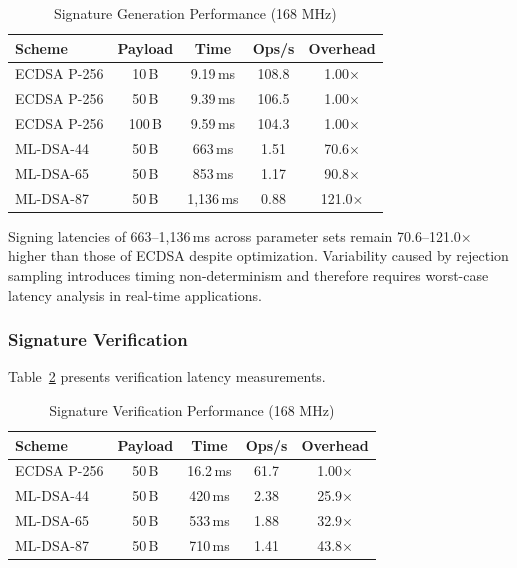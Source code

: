 \documentclass[final, twoside]{IEEEtran} %
\begin{document}
\begin{table}[h]
	\centering
	\caption{Signature Generation Performance (168 MHz)}
	\label{tab:sign-performance}
	\begin{tabular}{lcccc}
		\toprule
		\textbf{Scheme} & \textbf{Payload} & \textbf{Time} & \textbf{Ops/s} & \textbf{Overhead} \\
		\midrule
		ECDSA P-256     & 10\,B            & 9.19\,ms      & 108.8          & 1.00$\times$      \\
		ECDSA P-256     & 50\,B            & 9.39\,ms      & 106.5          & 1.00$\times$      \\
		ECDSA P-256     & 100\,B           & 9.59\,ms      & 104.3          & 1.00$\times$      \\
		\midrule
		ML-DSA-44       & 50\,B            & 663\,ms       & 1.51           & 70.6$\times$      \\
		ML-DSA-65       & 50\,B            & 853\,ms       & 1.17           & 90.8$\times$      \\
		ML-DSA-87       & 50\,B            & 1,136\,ms     & 0.88           & 121.0$\times$     \\
		\bottomrule
	\end{tabular}
\end{table}

Signing latencies of 663--1,136\,ms across parameter sets remain 70.6--121.0$\times$ higher than those of ECDSA despite optimization. Variability caused by rejection sampling introduces timing non-determinism and therefore requires worst-case latency analysis in real-time applications.

\subsubsection{Signature Verification}

Table~\ref{tab:verify-performance} presents verification latency measurements.

\begin{table}[h]
	\centering
	\caption{Signature Verification Performance (168 MHz)}
	\label{tab:verify-performance}
	\begin{tabular}{lcccc}
		\toprule
		\textbf{Scheme} & \textbf{Payload} & \textbf{Time} & \textbf{Ops/s} & \textbf{Overhead} \\
		\midrule
		ECDSA P-256     & 50\,B            & 16.2\,ms      & 61.7           & 1.00$\times$      \\
		ML-DSA-44       & 50\,B            & 420\,ms       & 2.38           & 25.9$\times$      \\
		ML-DSA-65       & 50\,B            & 533\,ms       & 1.88           & 32.9$\times$      \\
		ML-DSA-87       & 50\,B            & 710\,ms       & 1.41           & 43.8$\times$      \\
		\bottomrule
	\end{tabular}
\end{table}
\end{document}
